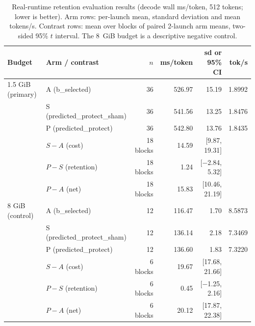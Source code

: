 \begin{table}[t]
\centering
\caption{Real-runtime retention evaluation results (decode wall ms/token, 512 tokens; lower is better). Arm rows: per-launch mean, standard deviation and mean tokens/s. Contrast rows: mean over blocks of paired 2-launch arm means, two-sided 95\% $t$ interval. The 8~GiB budget is a descriptive negative control.}
\label{tab:runtime}
\small
\begin{tabular}{llrrrr}
\toprule
Budget & Arm / contrast & $n$ & ms/token & sd or 95\% CI & tok/s \\
\midrule
1.5 GiB (primary) & A (b\_selected) & 36 & 526.97 & 15.19 & 1.8992 \\
 & S (predicted\_protect\_sham) & 36 & 541.56 & 13.25 & 1.8476 \\
 & P (predicted\_protect) & 36 & 542.80 & 13.76 & 1.8435 \\
 & $S-A$ (cost) & 18 blocks & 14.59 & [9.87, 19.31] & \\
 & $P-S$ (retention) & 18 blocks & 1.24 & [$-$2.84, 5.32] & \\
 & $P-A$ (net) & 18 blocks & 15.83 & [10.46, 21.19] & \\
\midrule
8 GiB (control) & A (b\_selected) & 12 & 116.47 & 1.70 & 8.5873 \\
 & S (predicted\_protect\_sham) & 12 & 136.14 & 2.18 & 7.3469 \\
 & P (predicted\_protect) & 12 & 136.60 & 1.83 & 7.3220 \\
 & $S-A$ (cost) & 6 blocks & 19.67 & [17.68, 21.66] & \\
 & $P-S$ (retention) & 6 blocks & 0.45 & [$-$1.25, 2.16] & \\
 & $P-A$ (net) & 6 blocks & 20.12 & [17.87, 22.38] & \\
\bottomrule
\end{tabular}
\end{table}

